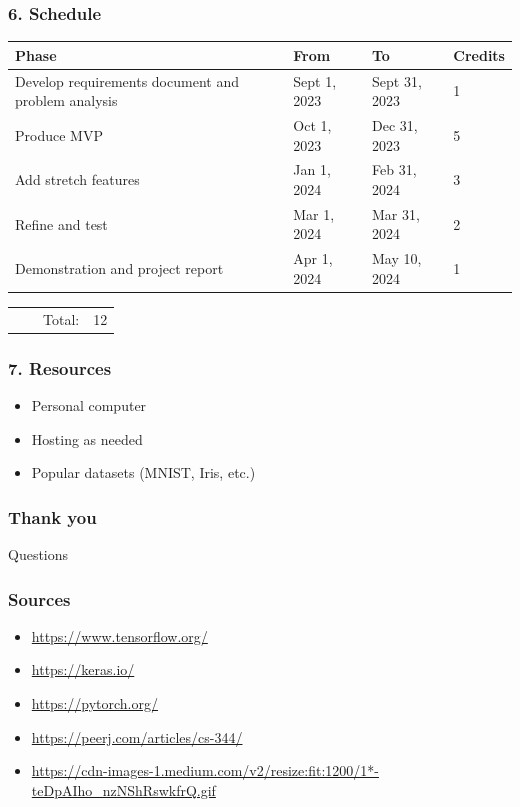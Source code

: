 \documentclass{beamer}
\begin{document}
\begin{frame}
    \frametitle{6. Schedule}
    \begin{tabular}{ |m{10em}|m{5em}|m{5em}|m{3em}| }
        \hline
        \textbf{Phase} & \textbf{From} & \textbf{To} & \textbf{Credits} \\  
        \hline
        Develop requirements document and problem analysis & Sept 1, 2023 & Sept 31, 2023 & 1 \\
        \hline
        Produce MVP & Oct 1, 2023 & Dec 31, 2023 & 5 \\
        \hline
        Add stretch features & Jan 1, 2024 & Feb 31, 2024 & 3 \\
        \hline
        Refine and test & Mar 1, 2024 & Mar 31, 2024 & 2 \\
        \hline
        Demonstration and project report & Apr 1, 2024 & May 10, 2024 & 1 \\
        \hline
    \end{tabular}
    \begin{tabular}{ m{10em} m{5em} m{5em} m{3em} }
        & & Total: & 12 \\
    \end{tabular}
\end{frame}

\begin{frame}
    \frametitle{7. Resources}
    \begin{itemize}
        \item Personal computer
        \item Hosting as needed
        \item Popular datasets (MNIST, Iris, etc.)
    \end{itemize}
\end{frame}

\begin{frame}
    \frametitle{Thank you}
    Questions
    \centering
\end{frame}

\begin{frame}
    \frametitle{Sources}
    \begin{itemize}
        \item \url{https://www.tensorflow.org/}
        \item \url{https://keras.io/}
        \item \url{https://pytorch.org/}
        \item \url{https://peerj.com/articles/cs-344/}
        \item \url{https://cdn-images-1.medium.com/v2/resize:fit:1200/1*-teDpAIho_nzNShRswkfrQ.gif}
    \end{itemize}
\end{frame}
\end{document}
